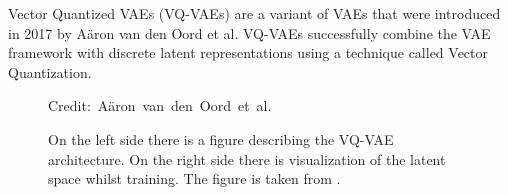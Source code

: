 Vector Quantized VAEs (VQ-VAEs) are a variant of VAEs that were introduced in 2017 by Aäron van den Oord et al\cite{vqvae}. VQ-VAEs successfully combine the VAE framework with discrete latent representations using a technique called Vector Quantization. 

\begin{figure}[H]
    \centering

    \caption{On the left side there is a figure describing the VQ-VAE architecture. On the right side there is visualization of the latent space whilst training. The figure is taken from \cite{vqvae}.}
  	\medskip 
	\hspace*{15pt}\hbox{\scriptsize Credit: Aäron van den Oord et al.}
    \label{VQVAEFigure}

\end{figure}
